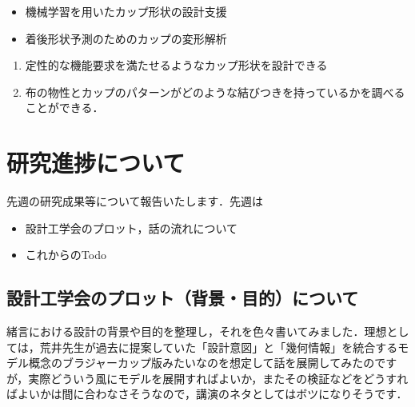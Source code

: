 \documentclass[11pt]{jsarticle}
\begin{document}
	\articleSPRabst
		\begin{itemize}
			\item 機械学習を用いたカップ形状の設計支援
			\item 着後形状予測のためのカップの変形解析
		\end{itemize}
		
		
	\articleSPRobj
		\begin{enumerate}
			\item 定性的な機能要求を満たせるようなカップ形状を設計できる
			\item 布の物性とカップのパターンがどのような結びつきを持っているかを調べることができる．
		\end{enumerate}
	\articleSPRitemsone
		
		\tableofcontents
		
		
	\articleSPRitemstwo
	\renewcommand{\labelitemi}{$\blacktriangledown$}
	\section{研究進捗について}
		先週の研究成果等について報告いたします．先週は
		\begin{itemize}
			\item 設計工学会のプロット，話の流れについて
			\item これからのTodo
		\end{itemize}
		
		\subsection{設計工学会のプロット（背景・目的）について}
		緒言における設計の背景や目的を整理し，それを色々書いてみました．理想としては，荒井先生が過去に提案していた「設計意図」と「幾何情報」を統合するモデル概念のブラジャーカップ版みたいなのを想定して話を展開してみたのですが，実際どういう風にモデルを展開すればよいか，またその検証などをどうすればよいかは間に合わなさそうなので，講演のネタとしてはボツになりそうです．
\end{document}
